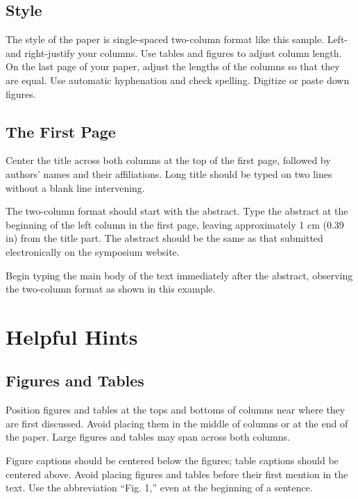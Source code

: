 \documentclass[conference,a4paper]{APSIPA2018}
\begin{document}

\subsection{Style}
The style of the paper is single-spaced two-column format like this
sample.  Left- and right-justify your columns.  Use tables and figures
to adjust column length.  On the last page of your paper, adjust the
lengths of the columns so that they are equal.  Use automatic
hyphenation and check spelling.  Digitize or paste down figures.

\subsection{The First Page}
Center the title across both columns at the top of the first page,
followed by authors' names and their affiliations.  Long title should
be typed on two lines without a blank line intervening.

The two-column format should start with the abstract.  Type the
abstract at the beginning of the left column in the first page,
leaving approximately 1 cm (0.39 in) from the title part.  The
abstract should be the same as that submitted electronically on the
symposium website.

Begin typing the main body of the text immediately after the abstract,
observing the two-column format as shown in this example.


\section{Helpful Hints}
\subsection{Figures and Tables}

Position figures and tables at the tops and bottoms of columns near
where they are first discussed.  Avoid placing them in the middle of
columns or at the end of the paper.  Large figures and tables may span
across both columns.

Figure captions should be centered below the figures; table captions
should be centered above.  Avoid placing figures and tables before
their first mention in the text.  Use the abbreviation ``Fig. 1,''
even at the beginning of a sentence.
\end{document}
